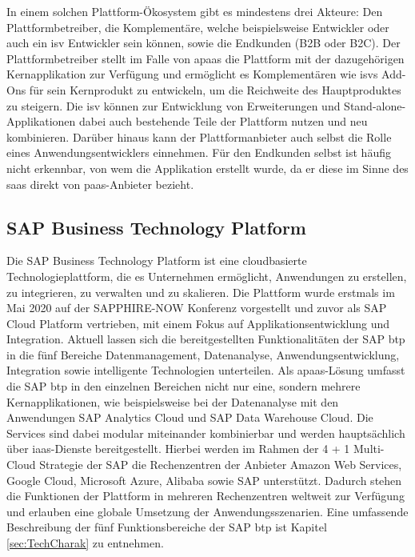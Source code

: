 
In einem solchen Plattform-Ökosystem gibt es mindestens drei Akteure: Den Plattformbetreiber, die Komplementäre, welche beispielsweise Entwickler oder auch ein \ac{isv} Entwickler sein können, sowie die Endkunden (B2B oder B2C). Der Plattformbetreiber stellt im Falle von \ac{apaas} die Plattform mit der dazugehörigen Kernapplikation zur Verfügung und ermöglicht es Komplementären wie \ac{isv}s Add-Ons für sein Kernprodukt zu entwickeln, um die Reichweite des Hauptproduktes zu steigern. Die \ac{isv} können zur Entwicklung von Erweiterungen und Stand-alone-Applikationen dabei auch bestehende Teile der Plattform nutzen und neu kombinieren. Darüber hinaus kann der Plattformanbieter auch selbst die Rolle eines Anwendungsentwicklers einnehmen.\autocite[Vgl.][S. 444f]{FOERDERER2018} Für den Endkunden selbst ist häufig nicht erkennbar, von wem die Applikation erstellt wurde, da er diese im Sinne des \ac{saas} direkt von \ac{paas}-Anbieter bezieht. \autocite[Vgl.][S. 372]{BEIMBORN2011}

\subsection{SAP Business Technology Platform}

Die SAP Business Technology Platform ist eine cloudbasierte Technologieplattform, die es Unternehmen ermöglicht, Anwendungen zu erstellen, zu integrieren, zu verwalten und zu skalieren. Die Plattform wurde erstmals im Mai 2020 auf der SAPPHIRE-NOW Konferenz vorgestellt und zuvor als SAP Cloud Platform vertrieben, mit einem Fokus auf Applikationsentwicklung und Integration.\autocite[Vgl.][S. 2]{PREUSS2021}  Aktuell lassen sich die bereitgestellten Funktionalitäten der SAP \ac{btp} in die fünf Bereiche Datenmanagement, Datenanalyse, Anwendungsentwicklung, Integration sowie intelligente Technologien unterteilen. Als \ac{apaas}-Lösung umfasst die SAP \ac{btp} in den einzelnen Bereichen nicht nur eine, sondern mehrere Kernapplikationen, wie beispielsweise bei der Datenanalyse mit den Anwendungen SAP Analytics Cloud und SAP Data Warehouse Cloud. Die Services sind dabei modular miteinander kombinierbar und werden hauptsächlich über \ac{iaas}-Dienste bereitgestellt. Hierbei werden im Rahmen der 4 + 1 Multi-Cloud Strategie der SAP die Rechenzentren der Anbieter Amazon Web Services, Google Cloud, Microsoft Azure, Alibaba sowie SAP unterstützt. Dadurch stehen die Funktionen der Plattform in mehreren Rechenzentren weltweit zur Verfügung und erlauben eine globale Umsetzung der Anwendungsszenarien.\autocite[Vgl.][S. 57-59]{SEUBERT2022} Eine umfassende Beschreibung der fünf Funktionsbereiche der SAP \ac{btp} ist Kapitel \ref{sec:TechCharak} zu entnehmen.

